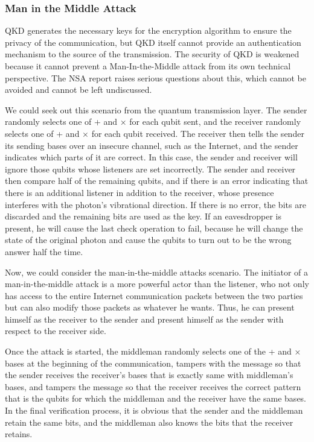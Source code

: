 \documentclass[sigconf]{acmart}
\begin{document}
\subsubsection{Man in the Middle Attack}
QKD generates the necessary keys for the encryption algorithm to ensure the privacy of the communication, but QKD itself cannot provide an authentication mechanism to the source of the transmission. The security of QKD is weakened because it cannot prevent a Man-In-the-Middle attack from its own technical perspective. The NSA report raises serious questions about this, which cannot be avoided and cannot be left undiscussed\cite{national_security_agency_nsa_quantum_nodate}.

We could seek out this scenario from the quantum transmission layer. The sender randomly selects one of + and × for each qubit sent, and the receiver randomly selects one of + and × for each qubit received. The receiver then tells the sender its sending bases over an insecure channel, such as the Internet, and the sender indicates which parts of it are correct. In this case, the sender and receiver will ignore those qubits whose listeners are set incorrectly. The sender and receiver then compare half of the remaining qubits, and if there is an error indicating that there is an additional listener in addition to the receiver, whose presence interferes with the photon's vibrational direction. If there is no error, the bits are discarded and the remaining bits are used as the key. If an eavesdropper is present, he will cause the last check operation to fail, because he will change the state of the original photon and cause the qubits to turn out to be the wrong answer half the time.

Now, we could consider the man-in-the-middle attacks scenario. The initiator of a man-in-the-middle attack is a more powerful actor than the listener, who not only has access to the entire Internet communication packets between the two parties but can also modify those packets as whatever he wants. Thus, he can present himself as the receiver to the sender and present himself as the sender with respect to the receiver side.

Once the attack is started, the middleman randomly selects one of the + and × bases at the beginning of the communication, tampers with the message so that the sender receives the receiver’s bases that is exactly same with middleman’s bases, and tampers the message so that the receiver receives the correct pattern that is the qubits for which the middleman and the receiver have the same bases. In the final verification process, it is obvious that the sender and the middleman retain the same bits, and the middleman also knows the bits that the receiver retains\cite{fei_quantum_2018}.
\end{document}
